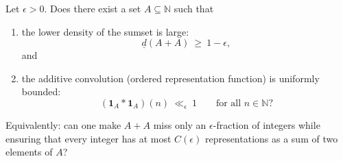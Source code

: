 Let $\epsilon>0$.
Does there exist a set $A\subseteq \mathbb{N}$ such that

\begin{enumerate}
\item the lower density of the sumset is large:
\[
\underline d(A+A)\ \ge\ 1-\epsilon,
\]
and
\item the additive convolution (ordered representation function) is uniformly bounded:
\[
(\mathbf 1_A * \mathbf 1_A)(n)\ \ll_\epsilon\ 1
\qquad\text{for all }n\in\mathbb{N}?
\]
\end{enumerate}

Equivalently: can one make $A+A$ miss only an $\epsilon$-fraction of integers while ensuring that every integer has at most $C(\epsilon)$ representations as a sum of two elements of $A$?
